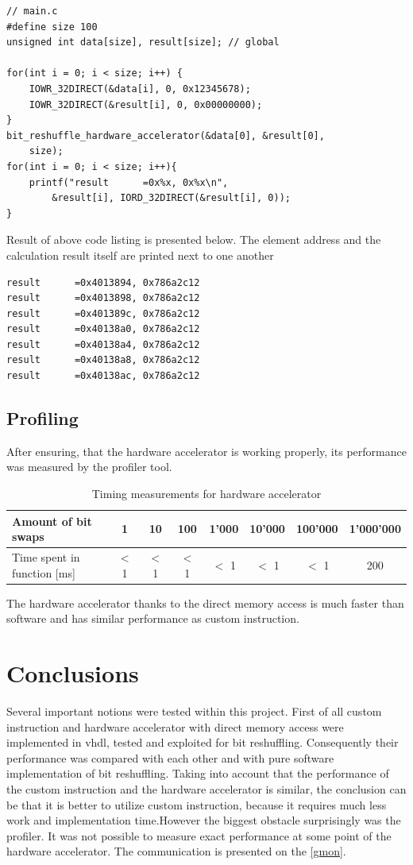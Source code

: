 \begin{lstlisting}[style=customc, frame=none]
// main.c
#define size 100 
unsigned int data[size], result[size]; // global

for(int i = 0; i < size; i++) {
    IOWR_32DIRECT(&data[i], 0, 0x12345678);
    IOWR_32DIRECT(&result[i], 0, 0x00000000);
}
bit_reshuffle_hardware_accelerator(&data[0], &result[0], 
    size);
for(int i = 0; i < size; i++){
    printf("result      =0x%x, 0x%x\n", 
        &result[i], IORD_32DIRECT(&result[i], 0));
}
\end{lstlisting}
Result of above code listing is presented below. The element address and the calculation result itself are printed next to one another
\begin{lstlisting}[frame=none]
result      =0x4013894, 0x786a2c12
result      =0x4013898, 0x786a2c12
result      =0x401389c, 0x786a2c12
result      =0x40138a0, 0x786a2c12
result      =0x40138a4, 0x786a2c12
result      =0x40138a8, 0x786a2c12
result      =0x40138ac, 0x786a2c12
\end{lstlisting}

\section{Profiling}
After ensuring, that the hardware accelerator is working properly, its performance was measured by the profiler tool.
\begin{table}[h!]
\centering
\begin{tabular}{    |l|c|c|c|c|c|c|c|  }
\hline
 Amount of bit swaps & 1 & 10 & 100 & 1'000 & 10'000 & 100'000 & 1'000'000\\
 \hline
 Time spent in function [ms]  & $<$ 1  & $<$ 1  & $<$ 1 & $<$ 1 & $<$ 1 & $<$ 1 & 200\\
 \hline
\end{tabular}
 \caption{Timing measurements for hardware accelerator}
\label{table:softwareCodeMeasure}
\end{table}
The hardware accelerator thanks to the direct memory access is much faster than software and has similar performance as custom instruction. 
\begingroup
\renewcommand{\cleardoublepage}{}
\renewcommand{\clearpage}{}
\chapter{Conclusions}
\endgroup
Several important notions were tested within this project. First of all custom instruction and hardware accelerator with direct memory access were implemented in vhdl, tested and exploited for bit reshuffling. Consequently their performance was compared with each other and with pure software implementation of bit reshuffling. Taking into account that the performance of the custom instruction and the hardware accelerator is similar, the conclusion can be that it is better to utilize custom instruction, because it requires much less work and implementation time.However the biggest obstacle surprisingly was the profiler. It was not possible to measure exact performance at some point of the hardware accelerator. The communication is presented on the \figurename{} \ref{gmon}. 

